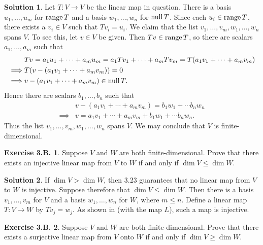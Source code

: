 \documentclass[12pt]{article}
\theoremstyle{definition}
\theoremstyle{exercise}
\newtheorem{exercise}{Exercise 3.B.}
\theoremstyle{solution}
\newtheorem*{solution}{Solution}
\newcommand{\Null}{\text{null\,}}
\newcommand{\Range}{\text{range\,}}
\begin{document}
\begin{solution}
    Let \( T : V \to V \) be the linear map in question. There is a basis \( u_1, \ldots, u_m \) for \( \Range T \) and a basis \( w_1, \ldots, w_n \) for \( \Null T \). Since each \( u_i \in \Range T \), there exists a \( v_i \in V \) such that \( Tv_i = u_i \). We claim that the list \( v_1, \ldots, v_m, w_1, \ldots, w_n \) spans \( V \). To see this, let \( v \in V \) be given. Then \( Tv \in \Range T \), so there are scalars \( a_1, \ldots, a_m \) such that
    \begin{align*}
        & Tv = a_1 u_1 + \cdots + a_m u_m = a_1 Tv_1 + \cdots + a_m Tv_m = T(a_1 v_1 + \cdots + a_m v_m) \\
        \implies & T(v - (a_1 v_1 + \cdots + a_m v_m)) = 0 \\
        \implies & v - (a_1 v_1 + \cdots + a_m v_m) \in \Null T.
    \end{align*}
    Hence there are scalars \( b_1, \ldots, b_n \) such that
    \begin{align*}
        & v - (a_1 v_1 + \cdots + a_m v_m) = b_1 w_1 + \cdots b_n w_n \\
        \implies & v = a_1 v_1 + \cdots + a_m v_m + b_1 w_1 + \cdots b_n w_n.
    \end{align*}
    Thus the list \( v_1, \ldots, v_m, w_1, \ldots, w_n \) spans \( V \). We may conclude that \( V \) is finite-dimensional.
\end{solution}

\begin{exercise}
\label{ex:17}
    Suppose \( V \) and \( W \) are both finite-dimensional. Prove that there exists an injective linear map from \( V \) to \( W \) if and only if \( \dim V \leq \dim W \).
\end{exercise}

\begin{solution}
    If \( \dim V > \dim W \), then 3.23 guarantees that no linear map from \( V \) to \( W \) is injective. Suppose therefore that \( \dim V \leq \dim W \). Then there is a basis \( v_1, \ldots, v_m \) for \( V \) and a basis \( w_1, \ldots, w_n \) for \( W \), where \( m \leq n \). Define a linear map \( T : V \to W \) by \( Tv_j = w_j \). As shown in  (with the map \( L \)), such a map is injective.
\end{solution}

\begin{exercise}
\label{ex:18}
    Suppose \( V \) and \( W \) are both finite-dimensional. Prove that there exists a surjective linear map from \( V \) onto \( W \) if and only if \( \dim V \geq \dim W \).
\end{exercise}
\end{document}
